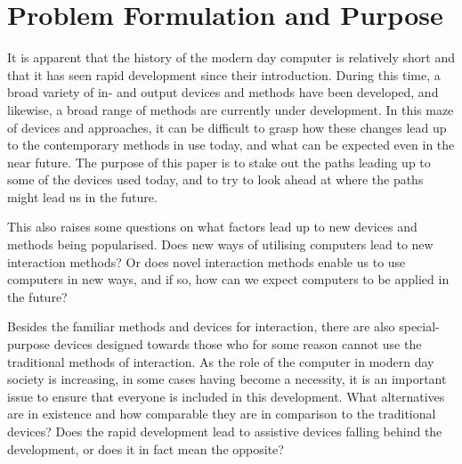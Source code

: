 
\section{Problem Formulation and Purpose}
It is apparent that the history of the modern day computer is relatively short and that it has seen rapid development since their introduction. During this time, a broad variety of in- and output devices and methods have been developed, and likewise, a broad range of methods are currently under development. In this maze of devices and approaches, it can be difficult to grasp how these changes lead up to the contemporary methods in use today, and what can be expected even in the near future. The purpose of this paper is to stake out the paths leading up to some of the devices used today, and to try to look ahead at where the paths might lead us in the future.

This also raises some questions on what factors lead up to new devices and methods being popularised. Does new ways of utilising computers lead to new interaction methods? Or does novel interaction methods enable us to use computers in new ways, and if so, how can we expect computers to be applied in the future?

Besides the familiar methods and devices for interaction, there are also special-purpose devices designed towards those who for some reason cannot use the traditional methods of interaction. As the role of the computer in modern day society is increasing, in some cases having become a necessity, it is an important issue to ensure that everyone is included in this development. What alternatives are in existence and how comparable they are in comparison to the traditional devices? Does the rapid development lead to assistive devices falling behind the development, or does it in fact mean the opposite?

